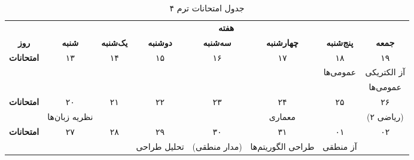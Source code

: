 \documentclass{article}
\begin{document}
	
	\begin{table}[h]
		\begin{center}	
			\caption{جدول امتحانات ترم ۴}	
			\begin{tabular}{|c|c|c|c|c|c|c|c|}
				\cline{2-8}
				\multicolumn{1}{c}{} &
				\multicolumn{7}{|c|}{\textbf{هفته}} \\
				\cline{1-8}
				
				\multicolumn{1}{|c|}{\textbf{روز}} &
				\textbf{شنبه} &
				\textbf{یک‌شنبه} & 
				\textbf{دوشنبه} & 
				\textbf{سه‌شنبه} & 
				\textbf{چهارشنبه} & 
				\textbf{پنج‌شنبه} & 
				\textbf{جمعه} \\ 
				\hline \hline
				
				\multirow{3}{*}{\textbf{امتحانات}}
				& ۱۳ & ۱۴ & ۱۵ & ۱۶ & ۱۷ & ۱۸ & ۱۹ \\
				\cline{2-8}
				& & & & & & {\large عمومی‌ها} & {\large آز الکتریکی} \\
				\cline{2-8}				
				& & & & & & & {\large عمومی‌ها} \\
				\hline \hline
				
				\multirow{2}{*}{\textbf{امتحانات}}
				& ۲۰ & ۲۱ & ۲۲ & ۲۳ & ۲۴ & ۲۵ & ۲۶ \\
				\cline{2-8}
				& {\large نظریه زبان‌ها} & & & & {\large معماری} & & {\footnotesize (ریاضی ۲)} \\
				\hline \hline

				\multirow{2}{*}{\textbf{امتحانات}}
				& ۲۷ & ۲۸ & ۲۹ & ۳۰ & ۳۱ & ۰۱ & ۰۲ \\
				\cline{2-8}
				& & & {\large تحلیل طراحی} & {\footnotesize (مدار منطقی)} & {\large طراحی الگوریتم‌ها} & {\large آز منطقی} & \\
				\hline
				
			\end{tabular}
		\end{center}
	\end{table}
\end{document}
